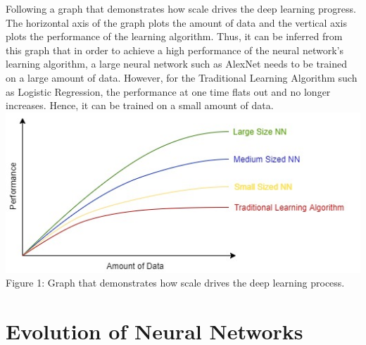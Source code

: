 \documentclass[conference]{IEEEtran}
\begin{document}
Following a graph that demonstrates how scale drives the deep learning progress. The horizontal axis of the graph plots the amount of data and the vertical axis plots the performance of the learning algorithm. Thus, it can be inferred from this graph that in order to achieve a high performance of the neural network's learning algorithm, a large neural network such as AlexNet needs to be trained on a large amount of data. However, for the Traditional Learning Algorithm such as Logistic Regression, the performance at one time flats out and no longer increases. Hence, it can be trained on a small amount of data.\\

\includegraphics[scale=0.48]{graph1.jpg}\\
Figure 1: Graph that demonstrates how scale drives the deep learning process.


\section{\textbf{Evolution of Neural Networks}}
\end{document}
